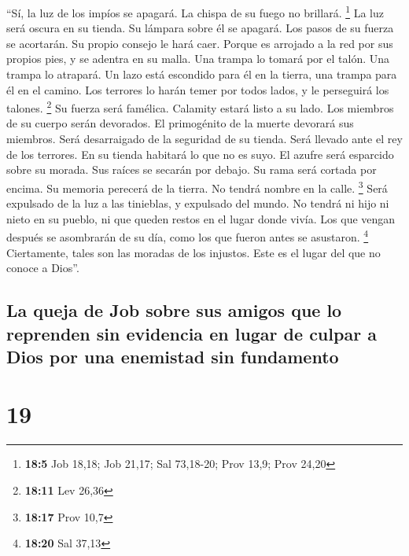  ``Sí, la luz de los impíos se apagará. La chispa de su
fuego no brillará. \footnote{\textbf{18:5} Job 18,18; Job 21,17; Sal
  73,18-20; Prov 13,9; Prov 24,20}  La luz será oscura en
su tienda. Su lámpara sobre él se apagará.  Los pasos de
su fuerza se acortarán. Su propio consejo le hará caer. 
Porque es arrojado a la red por sus propios pies, y se adentra en su
malla.  Una trampa lo tomará por el talón. Una trampa lo
atrapará.  Un lazo está escondido para él en la tierra,
una trampa para él en el camino.  Los terrores lo harán
temer por todos lados, y le perseguirá los talones. \footnote{\textbf{18:11}
  Lev 26,36}  Su fuerza será famélica. Calamity estará
listo a su lado.  Los miembros de su cuerpo serán
devorados. El primogénito de la muerte devorará sus miembros.
 Será desarraigado de la seguridad de su tienda. Será
llevado ante el rey de los terrores.  En su tienda
habitará lo que no es suyo. El azufre será esparcido sobre su morada.
 Sus raíces se secarán por debajo. Su rama será cortada
por encima.  Su memoria perecerá de la tierra. No tendrá
nombre en la calle. \footnote{\textbf{18:17} Prov 10,7} 
Será expulsado de la luz a las tinieblas, y expulsado del mundo.
 No tendrá ni hijo ni nieto en su pueblo, ni que queden
restos en el lugar donde vivía.  Los que vengan después
se asombrarán de su día, como los que fueron antes se asustaron.
\footnote{\textbf{18:20} Sal 37,13}  Ciertamente, tales
son las moradas de los injustos. Este es el lugar del que no conoce a
Dios''.

\hypertarget{la-queja-de-job-sobre-sus-amigos-que-lo-reprenden-sin-evidencia-en-lugar-de-culpar-a-dios-por-una-enemistad-sin-fundamento}{%
\subsection{La queja de Job sobre sus amigos que lo reprenden sin
evidencia en lugar de culpar a Dios por una enemistad sin
fundamento}\label{la-queja-de-job-sobre-sus-amigos-que-lo-reprenden-sin-evidencia-en-lugar-de-culpar-a-dios-por-una-enemistad-sin-fundamento}}

\hypertarget{section-18}{%
\section{19}\label{section-18}}


